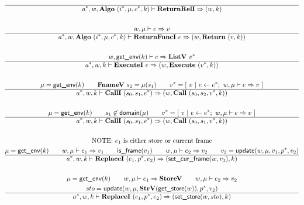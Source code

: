 \begin{gather*}
\newline \\
  \\
  \hline
  \seq{a}, w, \algo~ (\seq{i}, \mu, \seq c, k) \vdash \returnreli \Rightarrow (w, k) \\
%
\newline \\
  w, \mu \vdash e \Rightarrow v \\
  \hline
  \seq{a}, w, \algo ~ (\seq{i}, \mu, \seq c, k) \vdash \returnfunci ~ e \Rightarrow (w, \ret ~ (v, k)) \\
%
\newline \\
  w, \getenv(k) \vdash e \Rightarrow \listv ~ \seq v \\
  \hline
  \seq{a}, w, k \vdash \executei ~ e \Rightarrow (w, \exe ~ (\seq v, k)) \\
%
\newline \\
  \mu = \getenv(k) \qquad
  \fnamev ~ s_2 = \mu(s_1) \qquad
  \seq{v} = [ ~ v ~ | ~ e \leftarrow \seq{e}; ~ w, \mu \vdash e \Rightarrow v ~ ] \\
  \hline
  \seq{a}, w, k \vdash \calli ~ (s_0, s_1, \seq e) \Rightarrow (w, \call ~ (s_0, s_2, \seq v, k)) \\
%
\newline \\
  \mu = \getenv(k) \qquad
  s_1 \not\in \domain(\mu) \qquad
  \seq{v} = [ ~ v ~ | ~ e \leftarrow \seq{e}; ~ w, \mu \vdash e \Rightarrow v ~ ] \\
  \hline
  \seq{a}, w, k \vdash \calli ~ (s_0, s_1, \seq e) \Rightarrow (w, \call ~ (s_0, s_1, \seq v, k)) \\
%
\newline \\
\text{NOTE: $e_1$ is either store or current frame} \\
  \mu = \getenv(k) \qquad
  w, \mu \vdash e_1 \Rightarrow v_1 \qquad
  \isframe(v_1) \qquad
  w, \mu \vdash e_2 \Rightarrow v_2 \qquad
  v_3 = \update(w, \mu, v_1, \seq p, v_2) \\
  \hline
  \seq{a}, w, k \vdash \replacei ~ (e_1, \seq{p}, e_2) \Rightarrow (\setcurframe(w, v_3), k) \\
%
\newline \\
  \mu = \getenv(k) \qquad
  w, \mu \vdash e_1 \Rightarrow \storev \qquad
  w, \mu \vdash e_2 \Rightarrow v_2 \\
  sto = \update(w, \mu, \strv (\getstore(w)), \seq p, v_2) \\
  \hline
  \seq{a}, w, k \vdash \replacei ~ (e_1, \seq{p}, e_2)
  \Rightarrow (\setstore(w, sto), k) \\
\end{gather*}

